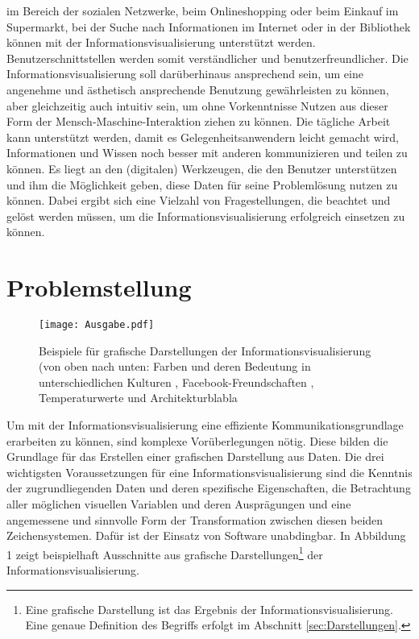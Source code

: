 \documentclass[a4paper, 12pt, DIVcalc, onepage, pdftex, headsepline, footsepline]{scrreprt}
\begin{document}
im Bereich der sozialen Netzwerke, beim Onlineshopping oder beim Einkauf im Supermarkt, bei der Suche nach Informationen
im Internet oder in der Bibliothek können mit der Informationsvisualisierung unterstützt
werden. Benutzerschnittstellen werden somit verständlicher und benutzerfreundlicher.
Die Informationsvisualisierung soll darüberhinaus ansprechend sein, um eine angenehme und ästhetisch ansprechende Benutzung
gewährleisten zu können, aber gleichzeitig auch intuitiv sein, um ohne Vorkenntnisse Nutzen aus
dieser Form der Mensch-Maschine-Interaktion ziehen zu können. Die tägliche Arbeit kann
unterstützt werden, damit es Gelegenheitsanwendern leicht gemacht wird, Informationen und
Wissen noch besser mit anderen kommunizieren und teilen zu können. Es liegt an den (digitalen) Werkzeugen,
die den Benutzer unterstützen und ihm die Möglichkeit geben, diese Daten für seine Problemlösung nutzen zu können.
Dabei ergibt sich eine Vielzahl von Fragestellungen, die beachtet und gelöst werden müssen, um die
Informationsvisualisierung erfolgreich einsetzen zu können.

\section{Problemstellung}
\begin{figure}
\centering
\texttt{[image: Ausgabe.pdf]}
\caption{Beispiele für grafische Darstellungen der Informationsvisualisierung (von oben nach unten: Farben und
deren Bedeutung in unterschiedlichen Kulturen \citep{mccandless}, Facebook-Freundschaften \citep{facebook},
Temperaturwerte \citep{temp} und Architekturblabla \citep{architect} }
\label{fig:beispiel}
\end{figure}
Um mit der Informationsvisualisierung eine effiziente Kommunikationsgrundlage erarbeiten zu können, sind komplexe
Vorüberlegungen nötig. Diese bilden die Grundlage für das Erstellen einer grafischen Darstellung aus Daten.
Die drei wichtigsten Voraussetzungen für eine Informationsvisualisierung sind die Kenntnis der
zugrundliegenden Daten und deren spezifische Eigenschaften, die Betrachtung aller möglichen visuellen Variablen und deren Ausprägungen
und eine angemessene und sinnvolle Form der Transformation zwischen diesen beiden Zeichensystemen.
Dafür ist der Einsatz von Software unabdingbar.
In Abbildung 1 zeigt beispielhaft Ausschnitte aus grafische Darstellungen\footnote{Eine grafische Darstellung
ist das Ergebnis der Informationsvisualisierung. Eine genaue Definition
des Begriffs erfolgt im Abschnitt \ref{sec:Darstellungen}.} der Informationsvisualisierung.
\end{document}
